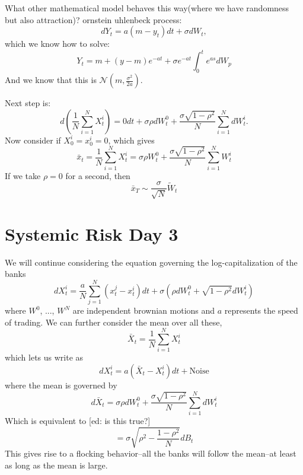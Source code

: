 What other mathematical model behaves this way(where we have randomness but also attraction)? ornstein uhlenbeck process:
\begin{equation}
	dY_t = a(m-y_t)dt + \sigma dW_t,
\end{equation}
which we know how to solve:
\begin{equation}
	Y_t = m + (y-m)e^{-at} + \sigma e^{-at} \int_0^t e^{as}dW_p
\end{equation}
And we know that this is $\mathcal{N}(m, \frac{\sigma^2}{2a})$.

Next step is:
\begin{equation}
	d(\frac{1}{N} \sum_{i=1}^N X_t^i ) = 0 dt + \sigma \rho dW_t^0 + \frac{\sigma\sqrt{1-\rho^2}}{N} \sum_{i=1}^N dW_t^i.
\end{equation}
Now consider if $X_0^i=x_0^i=0$, which gives
\begin{equation}
	\bar{x}_t = \frac{1}{N}\sum_{i=1}^N X_t^i = \sigma \rho W_t^0 + \frac{\sigma \sqrt{1-\rho^2}}{N} \sum_{i=1}^N W_t^i
\end{equation}
If we take $\rho=0$ for a second, then
\begin{equation}
	\bar{x}_T \sim \frac{\sigma}{\sqrt{N}}\tilde{W}_t
\end{equation}


\chapter{Systemic Risk Day 3}
We will continue considering the equation governing the log-capitalization of the banks
\begin{equation}
	dX_t^i = \frac{a}{N} \sum_{j=1}^N (x_t^j - x_t^i)dt + \sigma (\rho dW_t^0 + \sqrt{1-\rho^2} dW_t^i)
\end{equation}
where $W^0$, ..., $W^N$ are independent brownian motions and $a$ represents the speed of trading. We can further consider the mean over all these,
\begin{equation}
	\bar{X}_t = \frac{1}{N} \sum_{i=1}^N X_t^i
\end{equation}
which lets us write as
\begin{equation}
	d X_t^i = a (\bar{X}_t - X_t^i)dt + \text{Noise}
\end{equation}
where the mean is governed by
\begin{equation}
	d\bar{X}_t = \sigma\rho dW_t^0 + \frac{\sigma \sqrt{1-\rho^2}}{N}\sum_{i=1}^N dW_t^i
\end{equation}
Which is equivalent to [ed: is this true?]
\begin{equation}
	= \sigma \sqrt{\rho^2 - \frac{1-\rho^2}{N}}dB_t
\end{equation}
This gives rise to a flocking behavior--all the banks will follow the mean--at least as long as the mean is large.

